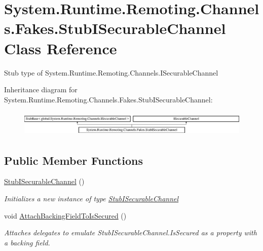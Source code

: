 \hypertarget{class_system_1_1_runtime_1_1_remoting_1_1_channels_1_1_fakes_1_1_stub_i_securable_channel}{\section{System.\-Runtime.\-Remoting.\-Channels.\-Fakes.\-Stub\-I\-Securable\-Channel Class Reference}
\label{class_system_1_1_runtime_1_1_remoting_1_1_channels_1_1_fakes_1_1_stub_i_securable_channel}
}


Stub type of System.\-Runtime.\-Remoting.\-Channels.\-I\-Securable\-Channel 


Inheritance diagram for System.\-Runtime.\-Remoting.\-Channels.\-Fakes.\-Stub\-I\-Securable\-Channel\-:\begin{figure}[H]
\begin{center}
\leavevmode
\includegraphics[height=1.252796cm]{class_system_1_1_runtime_1_1_remoting_1_1_channels_1_1_fakes_1_1_stub_i_securable_channel}
\end{center}
\end{figure}
\subsection*{Public Member Functions}
\begin{DoxyCompactItemize}
\item 
\hyperlink{class_system_1_1_runtime_1_1_remoting_1_1_channels_1_1_fakes_1_1_stub_i_securable_channel_a58774ebe0422a29cd9a464b2b94a82df}{Stub\-I\-Securable\-Channel} ()
\begin{DoxyCompactList}\small\item\em Initializes a new instance of type \hyperlink{class_system_1_1_runtime_1_1_remoting_1_1_channels_1_1_fakes_1_1_stub_i_securable_channel}{Stub\-I\-Securable\-Channel}\end{DoxyCompactList}\item 
void \hyperlink{class_system_1_1_runtime_1_1_remoting_1_1_channels_1_1_fakes_1_1_stub_i_securable_channel_a77b0bd0d405d0037cf4ccd00db0f6c70}{Attach\-Backing\-Field\-To\-Is\-Secured} ()
\begin{DoxyCompactList}\small\item\em Attaches delegates to emulate Stub\-I\-Securable\-Channel.\-Is\-Secured as a property with a backing field.\end{DoxyCompactList}\end{DoxyCompactItemize}
